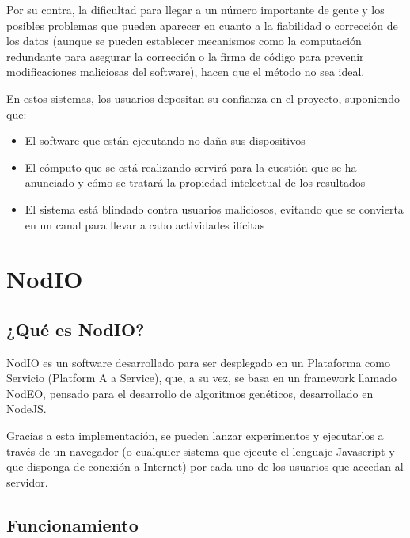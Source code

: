 \documentclass[runningheads,a4paper]{llncs}
\begin{document}
Por su contra, la dificultad para llegar a un n\'umero importante de gente y los posibles
problemas que pueden aparecer en cuanto a la fiabilidad o correcci\'on de los datos
(aunque se pueden establecer mecanismos como la computaci\'on redundante
para asegurar la correcci\'on o la firma de c\'odigo para prevenir modificaciones maliciosas
del software), hacen que el m\'etodo no sea ideal.

En estos sistemas, los usuarios depositan su confianza en el proyecto, suponiendo que:
\begin{itemize}
  \item El software que est\'an ejecutando no da\~na sus dispositivos
  \item El c\'omputo que se est\'a realizando servir\'a para la cuesti\'on que se
  ha anunciado y c\'omo se tratar\'a la propiedad intelectual de los resultados
  \item El sistema est\'a blindado contra usuarios maliciosos, evitando que
  se convierta en un canal para llevar a cabo actividades il\'icitas
\end{itemize}

\section{NodIO}
\subsection{¿Qu\'e es NodIO?}
NodIO \cite{nodio} es un software desarrollado para ser desplegado en un
Plataforma como Servicio (Platform A a Service), que, a su vez, se basa en un
framework llamado NodEO, pensado para el desarrollo de algoritmos gen\'eticos,
desarrollado en NodeJS.

Gracias a esta implementaci\'on, se pueden lanzar experimentos y ejecutarlos a
trav\'es de un navegador (o cualquier sistema que ejecute el lenguaje Javascript
y que disponga de conexi\'on a Internet)
por cada uno de los usuarios que accedan al servidor.


\subsection{Funcionamiento}
\end{document}
